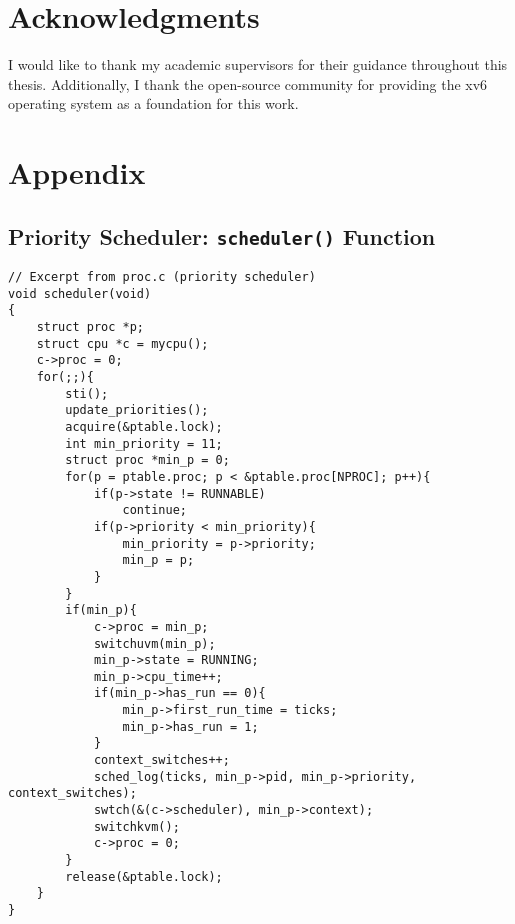 \documentclass[12pt]{article}
\begin{document}
\section*{Acknowledgments}
I would like to thank my academic supervisors for their guidance throughout this thesis. Additionally, I thank the open-source community for providing the xv6 operating system as a foundation for this work.

\section*{Appendix}
\label{sec:appendix}

\subsection*{Priority Scheduler: \texttt{scheduler()} Function}
\begin{lstlisting}
// Excerpt from proc.c (priority scheduler)
void scheduler(void)
{
    struct proc *p;
    struct cpu *c = mycpu();
    c->proc = 0;
    for(;;){
        sti();
        update_priorities();
        acquire(&ptable.lock);
        int min_priority = 11;
        struct proc *min_p = 0;
        for(p = ptable.proc; p < &ptable.proc[NPROC]; p++){
            if(p->state != RUNNABLE)
                continue;
            if(p->priority < min_priority){
                min_priority = p->priority;
                min_p = p;
            }
        }
        if(min_p){
            c->proc = min_p;
            switchuvm(min_p);
            min_p->state = RUNNING;
            min_p->cpu_time++;
            if(min_p->has_run == 0){
                min_p->first_run_time = ticks;
                min_p->has_run = 1;
            }
            context_switches++;
            sched_log(ticks, min_p->pid, min_p->priority, context_switches);
            swtch(&(c->scheduler), min_p->context);
            switchkvm();
            c->proc = 0;
        }
        release(&ptable.lock);
    }
}
\end{lstlisting}
\end{document}
